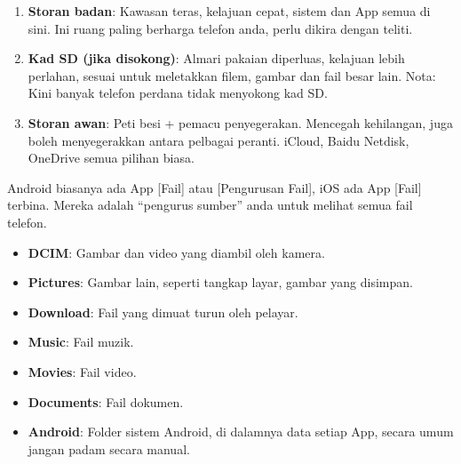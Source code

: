 


\begin{enumerate}
  \item \textbf{Storan badan}: Kawasan teras, kelajuan cepat, sistem dan App semua di sini. Ini ruang paling berharga telefon anda, perlu dikira dengan teliti.
  \item \textbf{Kad SD (jika disokong)}: Almari pakaian diperluas, kelajuan lebih perlahan, sesuai untuk meletakkan filem, gambar dan fail besar lain. Nota: Kini banyak telefon perdana tidak menyokong kad SD.
  \item \textbf{Storan awan}: Peti besi + pemacu penyegerakan. Mencegah kehilangan, juga boleh menyegerakkan antara pelbagai peranti. iCloud, Baidu Netdisk, OneDrive semua pilihan biasa.
\end{enumerate}


Android biasanya ada App [Fail] atau [Pengurusan Fail], iOS ada App [Fail] terbina. Mereka adalah “pengurus sumber” anda untuk melihat semua fail telefon.


\begin{itemize}
  \item \textbf{DCIM}: Gambar dan video yang diambil oleh kamera.
  \item \textbf{Pictures}: Gambar lain, seperti tangkap layar, gambar yang disimpan.
  \item \textbf{Download}: Fail yang dimuat turun oleh pelayar.
  \item \textbf{Music}: Fail muzik.
  \item \textbf{Movies}: Fail video.
  \item \textbf{Documents}: Fail dokumen.
  \item \textbf{Android}: Folder sistem Android, di dalamnya data setiap App, secara umum jangan padam secara manual.
\end{itemize}


